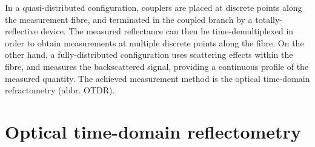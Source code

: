 \documentclass{standalone}
\begin{document}
In a quasi-distributed configuration, couplers are placed at discrete points along the measurement fibre, and terminated in the coupled branch by a totally-reflective device. The measured reflectance can then be time-demultiplexed in order to obtain measurements at multiple discrete points along the fibre. On the other hand, a fully-distributed configuration uses scattering effects within the fibre, and measures the backscattered signal, providing a continuous profile of the measured quantity. The achieved measurement method is the optical time-domain refractometry (abbr. OTDR).\\

\section{Optical time-domain reflectometry}
\end{document}

